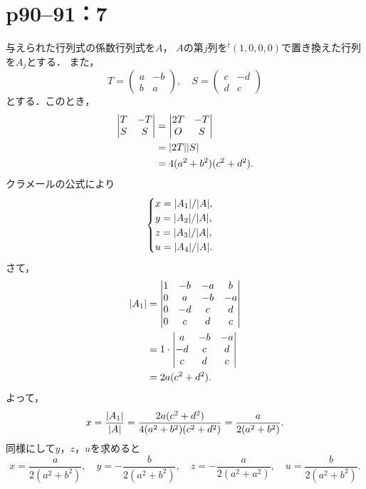 \documentclass[a4paper,10pt,fleqn]{ltjsarticle}
\begin{document}
\newpage

\section*{p90--91：7}


\begin{tleftbar}
    与えられた行列式の係数行列式を$A$， $A$の第$j$列を${}^t (1, 0, 0 ,0 )$で置き換えた行列を$A_j$とする．
    また，
    \[
        T = \begin{pmatrix} a & -b\\ b & a \end{pmatrix},\quad S = \begin{pmatrix} c & -d\\ d & c \end{pmatrix}
    \]
    とする．このとき，
    \begin{align*}
        \begin{vmatrix} T & -T \\  S & S \end{vmatrix} & = \begin{vmatrix} 2T & - T \\ O & S \end{vmatrix} \\
                                                       & = \abs{2T} \abs{S}                                \\
                                                       & = 4(a^2+b^2) (c^2+d^2).
    \end{align*}
    クラメールの公式により
    \[
        \begin{cases}
            x  = \abs{A_1}/\abs{A}, \\
            y = \abs{A_2}/\abs{A},  \\
            z = \abs{A_3}/\abs{A},  \\
            u = \abs{A_4}/\abs{A}.
        \end{cases}
    \]
    さて，
    \begin{align*}
        \abs{A_1} & = \begin{vmatrix} 1 & -b & -a & b \\ 0 & a & -b & -a \\ 0 & -d & c & d \\ 0 & c & d & c \end{vmatrix} \\
                  & = 1 \cdot \begin{vmatrix} a & -b & -a \\ -d & c & d \\ c & d & c \end{vmatrix}                        \\
                  & = 2a(c^2+d^2).
    \end{align*}
    よって，
    \[
        x = \frac{\abs{A_1}}{\abs{A}} = \frac{2a(c^2+d^2)}{4(a^2+b^2)(c^2+d^2)} = \frac{a}{2(a^2+b^2)}.
    \]
    同様にして$y$，$z$，$u$を求めると
    \[
        x= \frac{a}{2(a^2+b^2)},\quad y = -\frac{b}{2(a^2+b^2)},\quad z = -\frac{a}{2(a^2+a^2)},\quad u = \frac{b}{2(a^2+b^2)}.
    \]
\end{tleftbar}
\end{document}
